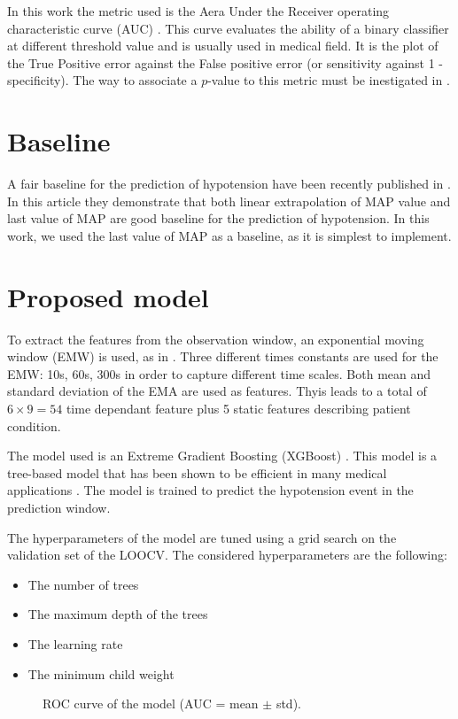 \documentclass[a4paper,12pt]{article}
\begin{document}
In this work the metric used is the Aera Under the Receiver operating characteristic curve (AUC) \cite{masonAreasRelativeOperating2002a}. This curve evaluates the ability of a binary classifier at different threshold value and is usually used in medical field. It is the plot of the True Positive error against the False positive error (or sensitivity against 1 - specificity). The way to associate a $p$-value to this metric must be inestigated in \cite{masonAreasRelativeOperating2002a}.

\section{Baseline}

A fair baseline for the prediction of hypotension have been recently published in \cite{jacquet-lagrezePredictionIntraoperativeHypotension2022}. In this article they demonstrate that both linear extrapolation of MAP value and last value of MAP are good baseline for the prediction of hypotension. In this work, we used the last value of MAP as a baseline, as it is simplest to implement. \medskip


\section{Proposed model}

To extract the features from the observation window, an exponential moving window (EMW) is used, as in \cite{lundbergExplainableMachinelearningPredictions2018}. Three different times constants are used for the EMW: 10s, 60s, 300s in order to capture different time scales. Both mean and standard deviation of the EMA are used as features. Thyis leads to a total of $6 \times 9 = 54$ time dependant feature plus 5 static features describing patient condition. \medskip

The model used is an Extreme Gradient Boosting (XGBoost) \cite{chenXGBoostScalableTree2016}. This model is a tree-based model that has been shown to be efficient in many medical applications \cite{chenXGBoostScalableTree2016}. The model is trained to predict the hypotension event in the prediction window. \medskip

The hyperparameters of the model are tuned using a grid search on the validation set of the LOOCV. The considered hyperparameters are the following:
\begin{itemize}
    \item The number of trees
    \item The maximum depth of the trees
    \item The learning rate
    \item The minimum child weight
\end{itemize}

\begin{figure}
    \centering
    
    \caption{ROC curve of the model (AUC = mean $\pm$ std).}
    \label{fig:roc}
\end{figure}



 
\end{document}
